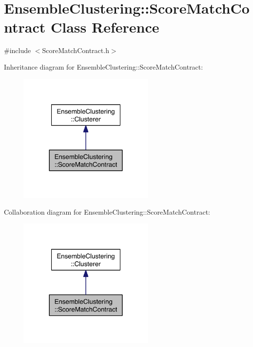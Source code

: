 \hypertarget{class_ensemble_clustering_1_1_score_match_contract}{\section{Ensemble\-Clustering\-:\-:Score\-Match\-Contract Class Reference}
\label{class_ensemble_clustering_1_1_score_match_contract}
}


{\ttfamily \#include $<$Score\-Match\-Contract.\-h$>$}



Inheritance diagram for Ensemble\-Clustering\-:\-:Score\-Match\-Contract\-:\nopagebreak
\begin{figure}[H]
\begin{center}
\leavevmode
\includegraphics[width=192pt]{class_ensemble_clustering_1_1_score_match_contract__inherit__graph}
\end{center}
\end{figure}


Collaboration diagram for Ensemble\-Clustering\-:\-:Score\-Match\-Contract\-:\nopagebreak
\begin{figure}[H]
\begin{center}
\leavevmode
\includegraphics[width=192pt]{class_ensemble_clustering_1_1_score_match_contract__coll__graph}
\end{center}
\end{figure}
